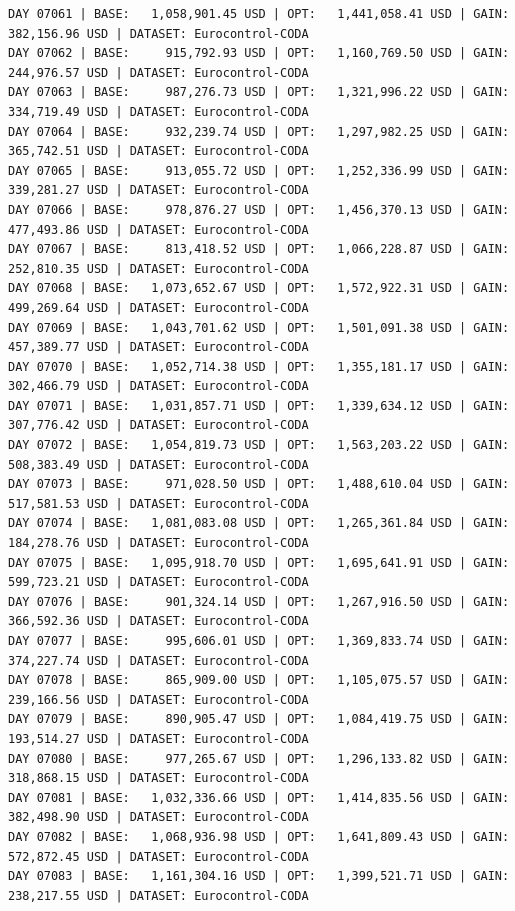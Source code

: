 \documentclass[11pt,a4paper]{article}
\begin{document}
\begin{verbatim}
DAY 07061 | BASE:   1,058,901.45 USD | OPT:   1,441,058.41 USD | GAIN: 382,156.96 USD | DATASET: Eurocontrol-CODA
DAY 07062 | BASE:     915,792.93 USD | OPT:   1,160,769.50 USD | GAIN: 244,976.57 USD | DATASET: Eurocontrol-CODA
DAY 07063 | BASE:     987,276.73 USD | OPT:   1,321,996.22 USD | GAIN: 334,719.49 USD | DATASET: Eurocontrol-CODA
DAY 07064 | BASE:     932,239.74 USD | OPT:   1,297,982.25 USD | GAIN: 365,742.51 USD | DATASET: Eurocontrol-CODA
DAY 07065 | BASE:     913,055.72 USD | OPT:   1,252,336.99 USD | GAIN: 339,281.27 USD | DATASET: Eurocontrol-CODA
DAY 07066 | BASE:     978,876.27 USD | OPT:   1,456,370.13 USD | GAIN: 477,493.86 USD | DATASET: Eurocontrol-CODA
DAY 07067 | BASE:     813,418.52 USD | OPT:   1,066,228.87 USD | GAIN: 252,810.35 USD | DATASET: Eurocontrol-CODA
DAY 07068 | BASE:   1,073,652.67 USD | OPT:   1,572,922.31 USD | GAIN: 499,269.64 USD | DATASET: Eurocontrol-CODA
DAY 07069 | BASE:   1,043,701.62 USD | OPT:   1,501,091.38 USD | GAIN: 457,389.77 USD | DATASET: Eurocontrol-CODA
DAY 07070 | BASE:   1,052,714.38 USD | OPT:   1,355,181.17 USD | GAIN: 302,466.79 USD | DATASET: Eurocontrol-CODA
DAY 07071 | BASE:   1,031,857.71 USD | OPT:   1,339,634.12 USD | GAIN: 307,776.42 USD | DATASET: Eurocontrol-CODA
DAY 07072 | BASE:   1,054,819.73 USD | OPT:   1,563,203.22 USD | GAIN: 508,383.49 USD | DATASET: Eurocontrol-CODA
DAY 07073 | BASE:     971,028.50 USD | OPT:   1,488,610.04 USD | GAIN: 517,581.53 USD | DATASET: Eurocontrol-CODA
DAY 07074 | BASE:   1,081,083.08 USD | OPT:   1,265,361.84 USD | GAIN: 184,278.76 USD | DATASET: Eurocontrol-CODA
DAY 07075 | BASE:   1,095,918.70 USD | OPT:   1,695,641.91 USD | GAIN: 599,723.21 USD | DATASET: Eurocontrol-CODA
DAY 07076 | BASE:     901,324.14 USD | OPT:   1,267,916.50 USD | GAIN: 366,592.36 USD | DATASET: Eurocontrol-CODA
DAY 07077 | BASE:     995,606.01 USD | OPT:   1,369,833.74 USD | GAIN: 374,227.74 USD | DATASET: Eurocontrol-CODA
DAY 07078 | BASE:     865,909.00 USD | OPT:   1,105,075.57 USD | GAIN: 239,166.56 USD | DATASET: Eurocontrol-CODA
DAY 07079 | BASE:     890,905.47 USD | OPT:   1,084,419.75 USD | GAIN: 193,514.27 USD | DATASET: Eurocontrol-CODA
DAY 07080 | BASE:     977,265.67 USD | OPT:   1,296,133.82 USD | GAIN: 318,868.15 USD | DATASET: Eurocontrol-CODA
DAY 07081 | BASE:   1,032,336.66 USD | OPT:   1,414,835.56 USD | GAIN: 382,498.90 USD | DATASET: Eurocontrol-CODA
DAY 07082 | BASE:   1,068,936.98 USD | OPT:   1,641,809.43 USD | GAIN: 572,872.45 USD | DATASET: Eurocontrol-CODA
DAY 07083 | BASE:   1,161,304.16 USD | OPT:   1,399,521.71 USD | GAIN: 238,217.55 USD | DATASET: Eurocontrol-CODA

\end{verbatim}
\end{document}
